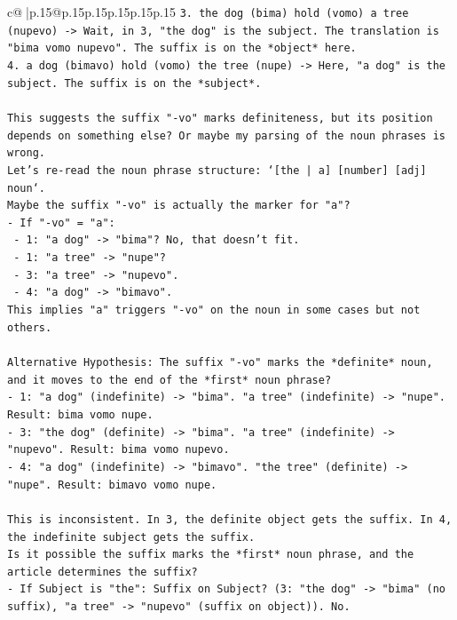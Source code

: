 \documentclass{article}
\begin{document}
{\begin{supertabular}{c@{$\;$}|p{.15\linewidth}@{}p{.15\linewidth}p{.15\linewidth}p{.15\linewidth}p{.15\linewidth}p{.15\linewidth}}
{{{\texttt{3. the dog (bima) hold (vomo) a tree (nupevo) {-}> Wait, in 3, "the dog" is the subject. The translation is "bima vomo nupevo". The suffix is on the *object* here.} \\
\texttt{4. a dog (bimavo) hold (vomo) the tree (nupe) {-}> Here, "a dog" is the subject. The suffix is on the *subject*.} \\
\\ 
\texttt{This suggests the suffix "{-}vo" marks definiteness, but its position depends on something else? Or maybe my parsing of the noun phrases is wrong.} \\
\texttt{Let's re{-}read the noun phrase structure: `{[}the | a{]} {[}number{]} {[}adj{]} noun`.} \\
\texttt{Maybe the suffix "{-}vo" is actually the marker for "a"?} \\
\texttt{{-} If "{-}vo" = "a":} \\
\texttt{  {-} 1: "a dog" {-}> "bima"? No, that doesn't fit.} \\
\texttt{  {-} 1: "a tree" {-}> "nupe"?} \\
\texttt{  {-} 3: "a tree" {-}> "nupevo".} \\
\texttt{  {-} 4: "a dog" {-}> "bimavo".} \\
\texttt{This implies "a" triggers "{-}vo" on the noun in some cases but not others.} \\
\\ 
\texttt{Alternative Hypothesis: The suffix "{-}vo" marks the *definite* noun, and it moves to the end of the *first* noun phrase?} \\
\texttt{{-} 1: "a dog" (indefinite) {-}> "bima". "a tree" (indefinite) {-}> "nupe". Result: bima vomo nupe.} \\
\texttt{{-} 3: "the dog" (definite) {-}> "bima". "a tree" (indefinite) {-}> "nupevo". Result: bima vomo nupevo.} \\
\texttt{{-} 4: "a dog" (indefinite) {-}> "bimavo". "the tree" (definite) {-}> "nupe". Result: bimavo vomo nupe.} \\
\\ 
\texttt{This is inconsistent. In 3, the definite object gets the suffix. In 4, the indefinite subject gets the suffix.} \\
\texttt{Is it possible the suffix marks the *first* noun phrase, and the article determines the suffix?} \\
\texttt{{-} If Subject is "the": Suffix on Subject? (3: "the dog" {-}> "bima" (no suffix), "a tree" {-}> "nupevo" (suffix on object)). No.} \\
}}}
\end{supertabular}}
\end{document}
